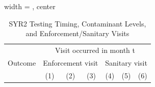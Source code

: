 
\begin{table}[htbp]
   
   \caption{\label{tab:sanitary_visit_syr2_enforcement_zscore_iterative} SYR2 Testing Timing, Contaminant Levels, and Enforcement/Sanitary Visits}
   \bigskip
   
   \centering
   
   \begin{adjustbox}{width = \textwidth, center}
      
      
      \begin{tabular}{lcccccc}
         \toprule
         
          & \multicolumn{6}{c}{Visit occurred in month t}\\
         
         Outcome & \multicolumn{3}{c}{Enforcement visit} & \multicolumn{3}{c}{Sanitary visit} \\ 
         
                                                & (1)            & (2)                    & (3)             & (4)             & (5)             & (6)\\  
         

\end{tabular}
\end{adjustbox}
\end{table}
